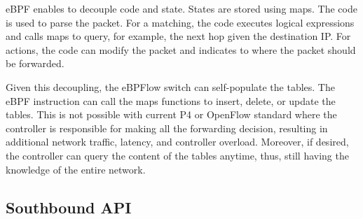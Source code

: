 eBPF enables to decouple code and state.
States are stored using maps.
The code is used to parse the packet.
For a matching, the code executes logical expressions and calls maps to query, for example, the next hop given the destination IP.
For actions, the code can modify the packet and indicates to where the packet should be forwarded.

Given this decoupling, the eBPFlow switch can self-populate the tables. The eBPF instruction can call the maps functions to insert, delete, or update the tables. This is not possible with current P4 or OpenFlow standard where
the controller is responsible for making
all the forwarding decision, resulting in additional 
network traffic, latency, and controller overload.
Moreover, if desired, the controller can query the content of the tables anytime, 
 thus, still having the knowledge of the entire network.


\subsection{Southbound API}
\label{sec:southboundAPI}

